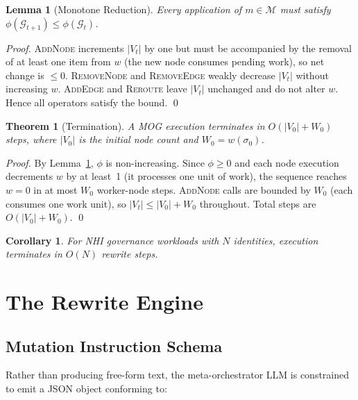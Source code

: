 \documentclass[conference]{IEEEtran}
\newtheorem{theorem}{Theorem}
\newtheorem{lemma}{Lemma}
\newtheorem{corollary}{Corollary}
\begin{document}
\begin{lemma}[Monotone Reduction]
  \label{lem:mono}
  Every application of $m\in\mathcal{M}$ must satisfy
  $\phi(\mathcal{G}_{t+1})\leq\phi(\mathcal{G}_t)$.
\end{lemma}

\begin{proof}
  \textsc{AddNode} increments $|V_t|$ by one but must be accompanied by
  the removal of at least one item from $w$ (the new node consumes
  pending work), so net change is $\leq 0$. \textsc{RemoveNode} and
  \textsc{RemoveEdge} weakly decrease $|V_t|$ without increasing $w$.
  \textsc{AddEdge} and \textsc{Reroute} leave $|V_t|$ unchanged and
  do not alter $w$. Hence all operators satisfy the bound. \hfill\qed
\end{proof}

\begin{theorem}[Termination]
  \label{thm:term}
  A MOG execution terminates in $O(|V_0| + W_0)$ steps, where
  $|V_0|$ is the initial node count and $W_0 = w(\sigma_0)$.
\end{theorem}

\begin{proof}
  By Lemma~\ref{lem:mono}, $\phi$ is non-increasing. Since
  $\phi\geq 0$ and each node execution decrements $w$ by at least~1
  (it processes one unit of work), the sequence reaches $w=0$ in
  at most $W_0$ worker-node steps. \textsc{AddNode} calls are
  bounded by $W_0$ (each consumes one work unit), so
  $|V_t|\leq|V_0|+W_0$ throughout. Total steps are
  $O(|V_0|+W_0)$. \hfill\qed
\end{proof}

\begin{corollary}
  For NHI governance workloads with $N$ identities,
  execution terminates in $O(N)$ rewrite steps.
\end{corollary}

\section{The Rewrite Engine}
\label{sec:engine}

\subsection{Mutation Instruction Schema}
Rather than producing free-form text, the meta-orchestrator LLM is
constrained to emit a JSON object conforming to:
\end{document}
